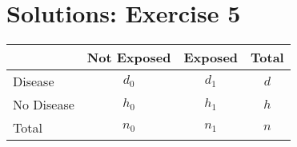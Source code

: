 \documentclass[12pt,a4paper,twoside]{article}
\begin{document}
\section*{Solutions: Exercise 5}

\begin{center}
  \begin{tabular}{ l c c c }
    & Not Exposed & Exposed & Total \\ \hline
    Disease    & $d_{0}$        & $d_{1}$   & $d$     \\
    No Disease & $h_{0}$        & $h_{1}$   & $h$     \\ \hline                 
    Total      & $n_{0}$        & $n_{1}$   & $n$     \\
  \end{tabular}
\end{center}
\end{document}
